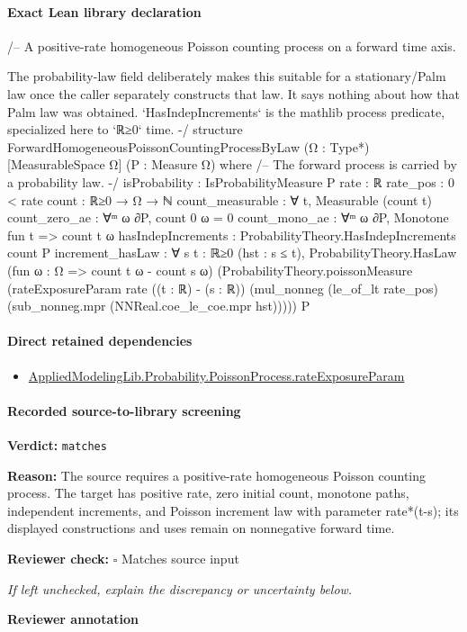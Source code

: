 \documentclass[10pt]{article}
\newcommand{\reviewerbox}{%
  \par\noindent\fbox{\parbox{0.96\linewidth}{\rule{0pt}{0.38in}}}\par
}
\newcommand{\reviewmatch}[1]{%
  \par\noindent\textbf{Reviewer check:} $\square$\; #1\par
  \noindent\emph{If left unchecked, explain the discrepancy or uncertainty below.}\par
}
\begin{document}
\paragraph{Exact Lean library declaration}
\begin{ReviewVerbatim}
/--
A positive-rate homogeneous Poisson counting process on a forward time axis.

The probability-law field deliberately makes this suitable for a
stationary/Palm law once the caller separately constructs that law.  It says
nothing about how that Palm law was obtained.  `HasIndepIncrements` is the
mathlib process predicate, specialized here to `ℝ≥0` time.
-/
structure ForwardHomogeneousPoissonCountingProcessByLaw
    (Ω : Type*) [MeasurableSpace Ω] (P : Measure Ω) where
  /-- The forward process is carried by a probability law. -/
  isProbability : IsProbabilityMeasure P
  rate : ℝ
  rate_pos : 0 < rate
  count : ℝ≥0 → Ω → ℕ
  count_measurable : ∀ t, Measurable (count t)
  count_zero_ae : ∀ᵐ ω ∂P, count 0 ω = 0
  count_mono_ae : ∀ᵐ ω ∂P, Monotone fun t => count t ω
  hasIndepIncrements : ProbabilityTheory.HasIndepIncrements count P
  increment_hasLaw :
    ∀ {s t : ℝ≥0} (hst : s ≤ t),
      ProbabilityTheory.HasLaw
        (fun ω : Ω => count t ω - count s ω)
        (ProbabilityTheory.poissonMeasure
          (rateExposureParam rate ((t : ℝ) - (s : ℝ))
            (mul_nonneg (le_of_lt rate_pos)
              (sub_nonneg.mpr (NNReal.coe_le_coe.mpr hst))))) P
\end{ReviewVerbatim}

\paragraph{Direct retained dependencies}
\begin{itemize}\raggedright
\item \hyperlink{library-prerequisite-c7492b765918e40d}{Applied\allowbreak{}Modeling\allowbreak{}Lib.\allowbreak{}Probability.\allowbreak{}Poisson\allowbreak{}Process.\allowbreak{}rate\allowbreak{}Exposure\allowbreak{}Param}
\end{itemize}
\paragraph{Recorded source-to-library screening}
\textbf{Verdict:} \texttt{matches}
\\
{\raggedright
\textbf{Reason:} The source requires a positive-\allowbreak{}rate homogeneous Poisson counting process.\allowbreak{} The target has positive rate, zero initial count, monotone paths, independent increments, and Poisson increment law with parameter rate*(t-\allowbreak{}s);\allowbreak{} its displayed constructions and uses remain on nonnegative forward time.\allowbreak{}
\par}
\reviewmatch{Matches source input}
\noindent\textbf{Reviewer annotation}\par
\reviewerbox
\clearpage
\hypertarget{paper-prerequisite-section-5ef5ef0364b6939c}{}
\end{document}
